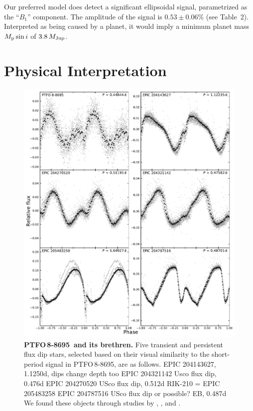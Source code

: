 \documentclass[12pt,twocolumn,tighten]{aastex62}
\newcommand{\ptfo}{PTFO$\,$8-8695}
\begin{document}
Our preferred model does detect a significant ellipsoidal signal,
parametrized as the ``$B_1$'' component.  The amplitude of the signal
is $0.53 \pm 0.06\%$ (see Table~2).  Interpreted as being caused by a planet, it
would imply a minimum planet mass $M_{\rm p} \sin i$ of $3.8\,M_{\rm
Jup}$.



\section{Physical Interpretation}

\begin{figure}[hbtp]
	\begin{center}
		\leavevmode
		\includegraphics[width=1\textwidth]{f7.pdf}
	\end{center}
	\vspace{-0.7cm}
  \caption{ {\bf \ptfo\ and its brethren.}
    Five transient and persistent flux dip stars, selected based on
    their visual similarity to the short-period signal in \ptfo, are
    as follows.
  	EPIC 204143627, 1.1250d, dips change depth too
  	EPIC 204321142  Usco flux dip, 0.476d
  	EPIC 204270520  USco flux dip, 0.512d
  	RIK-210 = EPIC 205483258
 	EPIC 204787516  USco flux dip or possible? EB, 0.487d
 	We found these objects through studies by \citet{stauffer_orbiting_2017}, \citet{david_transient_2017}, and \citet{rebull_usco_2018}.
		\label{fig:brethren}
	}
\end{figure}
\end{document}
